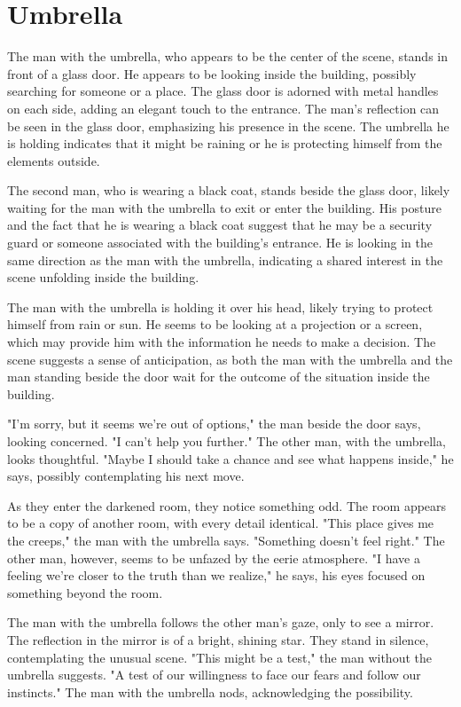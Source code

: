 \documentclass[smalldemyvopaper,11pt,twoside,onecolumn,openright,extrafontsizes]{memoir}
\begin{document}
\chapter{Umbrella}
The man with the umbrella, who appears to be the center of the scene, stands in front of a glass door. He appears to be looking inside the building, possibly searching for someone or a place. The glass door is adorned with metal handles on each side, adding an elegant touch to the entrance. The man's reflection can be seen in the glass door, emphasizing his presence in the scene. The umbrella he is holding indicates that it might be raining or he is protecting himself from the elements outside.\par
The second man, who is wearing a black coat, stands beside the glass door, likely waiting for the man with the umbrella to exit or enter the building. His posture and the fact that he is wearing a black coat suggest that he may be a security guard or someone associated with the building's entrance. He is looking in the same direction as the man with the umbrella, indicating a shared interest in the scene unfolding inside the building.\par
The man with the umbrella is holding it over his head, likely trying to protect himself from rain or sun. He seems to be looking at a projection or a screen, which may provide him with the information he needs to make a decision. The scene suggests a sense of anticipation, as both the man with the umbrella and the man standing beside the door wait for the outcome of the situation inside the building.\par
"I'm sorry, but it seems we're out of options," the man beside the door says, looking concerned. "I can't help you further." The other man, with the umbrella, looks thoughtful. "Maybe I should take a chance and see what happens inside," he says, possibly contemplating his next move.\par
As they enter the darkened room, they notice something odd. The room appears to be a copy of another room, with every detail identical. "This place gives me the creeps," the man with the umbrella says. "Something doesn't feel right." The other man, however, seems to be unfazed by the eerie atmosphere. "I have a feeling we're closer to the truth than we realize," he says, his eyes focused on something beyond the room.\par
The man with the umbrella follows the other man's gaze, only to see a mirror. The reflection in the mirror is of a bright, shining star. They stand in silence, contemplating the unusual scene. "This might be a test," the man without the umbrella suggests. "A test of our willingness to face our fears and follow our instincts." The man with the umbrella nods, acknowledging the possibility.\par
\end{document}
